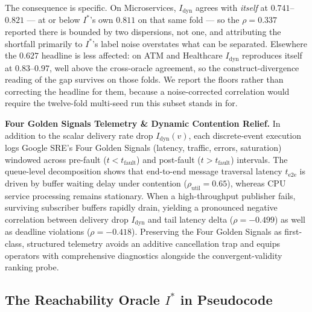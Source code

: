 \documentclass[preprint,3p]{elsarticle}
\begin{document}
\noindent The consequence is specific. On Microservices, $I_{\text{dyn}}$ agrees with \emph{itself} at $0.741$--$0.821$ --- at or below $I^*$'s own $0.811$ on that same fold --- so the $\rho = 0.337$ reported there is bounded by two dispersions, not one, and attributing the shortfall primarily to $I^*$'s label noise overstates what can be separated. Elsewhere the $0.627$ headline is less affected: on ATM and Healthcare $I_{\text{dyn}}$ reproduces itself at $0.83$--$0.97$, well above the cross-oracle agreement, so the construct-divergence reading of the gap survives on those folds. We report the floors rather than correcting the headline for them, because a noise-corrected correlation would require the twelve-fold multi-seed run this subset stands in for.

\noindent\textbf{Four Golden Signals Telemetry \& Dynamic Contention Relief.} In addition to the scalar delivery rate drop $I_{\text{dyn}}(v)$, each discrete-event execution logs Google SRE's Four Golden Signals (latency, traffic, errors, saturation) windowed across pre-fault ($t < t_{\text{fault}}$) and post-fault ($t > t_{\text{fault}}$) intervals. The queue-level decomposition shows that end-to-end message traversal latency $t_{\text{e2e}}$ is driven by buffer waiting delay under contention ($\rho_{\text{util}} = 0.65$), whereas CPU service processing remains stationary. When a high-throughput publisher fails, surviving subscriber buffers rapidly drain, yielding a pronounced negative correlation between delivery drop $I_{\text{dyn}}$ and tail latency delta ($\rho = -0.499$) as well as deadline violations ($\rho = -0.418$). Preserving the Four Golden Signals as first-class, structured telemetry avoids an additive cancellation trap and equips operators with comprehensive diagnostics alongside the convergent-validity ranking probe.

\subsection*{The Reachability Oracle \texorpdfstring{$I^*$}{I*} in Pseudocode}
\label{supp:istar}
\end{document}
